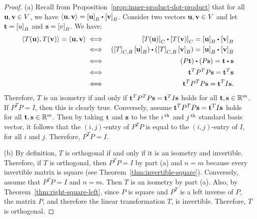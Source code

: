 \begin{proof}
  (a) Recall from Proposition~\ref{prop:inner-product-dot-product}
  that for all $\vect{u},\vect{v}\in V$, we have
  $\iprod{\vect{u},\vect{v}} = \coord{\vect{u}}_B\dotprod
  \coord{\vect{v}}_B$. Consider two vectors $\vect{u},\vect{v}\in V$
  and let $\vect{t}=\coord{u}_B$ and $\vect{s}=\coord{v}_B$. We have:
  \begin{eqnarray*}
    \iprod{T(\vect{u}),T(\vect{v})} = \iprod{\vect{u},\vect{v}}
    &\iff& \coord{T(\vect{u})}_C\dotprod \coord{T(\vect{v})}_C
           = \coord{\vect{u}}_B\dotprod \coord{\vect{v}}_B \\
    &\iff& (\coord{T}_{C,B}\coord{\vect{u}}_B)\dotprod (\coord{T}_{C,B}\coord{\vect{v}}_B)
           = \coord{\vect{u}}_B\dotprod \coord{\vect{v}}_B \\
    &\iff& (P\vect{t})\dotprod (P\vect{s})
           = \vect{t}\dotprod \vect{s} \\
    &\iff& \vect{t}^T P^T P\vect{s}
           = \vect{t}^T \vect{s} \\
    &\iff& \vect{t}^T P^T P\vect{s}
           = \vect{t}^T I \vect{s}.
  \end{eqnarray*}
  Therefore, $T$ is an isometry if and only if
  $\vect{t}^T P^T P\vect{s} = \vect{t}^T I \vect{s}$ holds for all
  $\vect{t},\vect{s}\in\R^m$. If $P^TP=I$, then this is clearly
  true. Conversely, assume
  $\vect{t}^T P^T P\vect{s} = \vect{t}^T I \vect{s}$ holds for all
  $\vect{t},\vect{s}\in\R^m$. Then by taking $\vect{t}$ and $\vect{s}$
  to be the $i^{\,\rm th}$ and $j^{\,\rm th}$ standard basis vector, it follows that
  the $(i,j)$-entry of $P^TP$ is equal to the $(i,j)$-entry of $I$,
  for all $i$ and $j$. Therefore, $P^TP=I$.

  (b) By definition, $T$ is orthogonal if and only if it is an
  isometry and invertible. Therefore, if $T$ is orthogonal, then
  $P^TP=I$ by part (a) and $n=m$ because every invertible matrix is
  square (see Theorem~\ref{thm:invertible-square}). Conversely, assume
  that $P^TP=I$ and $n=m$. Then $T$ is an isometry by part (a). Also,
  by Theorem~\ref{thm:right-square-left}, since $P$ is square and
  $P^T$ is a left inverse of $P$, the matrix $P$, and therefore the
  linear transformation $T$, is invertible. Therefore, $T$ is
  orthogonal.
\end{proof}

